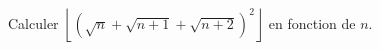 Calculer $\left\lfloor \left(\sqrt{n} + \sqrt{n + 1} + \sqrt{n + 2}\right)^2 \right\rfloor$ en fonction de $n$.
